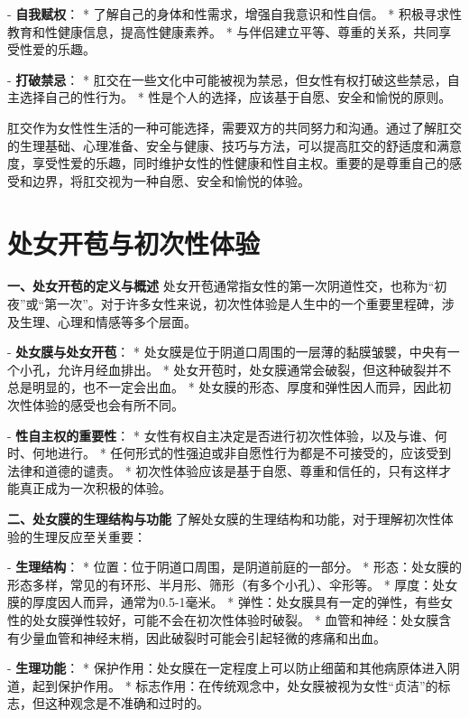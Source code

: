 \begin{enumerate}
  - \textbf{自我赋权}：
    * 了解自己的身体和性需求，增强自我意识和性自信。
    * 积极寻求性教育和性健康信息，提高性健康素养。
    * 与伴侣建立平等、尊重的关系，共同享受性爱的乐趣。

  - \textbf{打破禁忌}：
    * 肛交在一些文化中可能被视为禁忌，但女性有权打破这些禁忌，自主选择自己的性行为。
    * 性是个人的选择，应该基于自愿、安全和愉悦的原则。

肛交作为女性性生活的一种可能选择，需要双方的共同努力和沟通。通过了解肛交的生理基础、心理准备、安全与健康、技巧与方法，可以提高肛交的舒适度和满意度，享受性爱的乐趣，同时维护女性的性健康和性自主权。重要的是尊重自己的感受和边界，将肛交视为一种自愿、安全和愉悦的体验。

\section{处女开苞与初次性体验}

  \textbf{一、处女开苞的定义与概述}
  处女开苞通常指女性的第一次阴道性交，也称为“初夜”或“第一次”。对于许多女性来说，初次性体验是人生中的一个重要里程碑，涉及生理、心理和情感等多个层面。

  - \textbf{处女膜与处女开苞}：
    * 处女膜是位于阴道口周围的一层薄的黏膜皱襞，中央有一个小孔，允许月经血排出。
    * 处女开苞时，处女膜通常会破裂，但这种破裂并不总是明显的，也不一定会出血。
    * 处女膜的形态、厚度和弹性因人而异，因此初次性体验的感受也会有所不同。

  - \textbf{性自主权的重要性}：
    * 女性有权自主决定是否进行初次性体验，以及与谁、何时、何地进行。
    * 任何形式的性强迫或非自愿性行为都是不可接受的，应该受到法律和道德的谴责。
    * 初次性体验应该是基于自愿、尊重和信任的，只有这样才能真正成为一次积极的体验。

  \textbf{二、处女膜的生理结构与功能}
  了解处女膜的生理结构和功能，对于理解初次性体验的生理反应至关重要：

  - \textbf{生理结构}：
    * 位置：位于阴道口周围，是阴道前庭的一部分。
    * 形态：处女膜的形态多样，常见的有环形、半月形、筛形（有多个小孔）、伞形等。
    * 厚度：处女膜的厚度因人而异，通常为0.5-1毫米。
    * 弹性：处女膜具有一定的弹性，有些女性的处女膜弹性较好，可能不会在初次性体验时破裂。
    * 血管和神经：处女膜含有少量血管和神经末梢，因此破裂时可能会引起轻微的疼痛和出血。

  - \textbf{生理功能}：
    * 保护作用：处女膜在一定程度上可以防止细菌和其他病原体进入阴道，起到保护作用。
    * 标志作用：在传统观念中，处女膜被视为女性“贞洁”的标志，但这种观念是不准确和过时的。


\end{enumerate}
